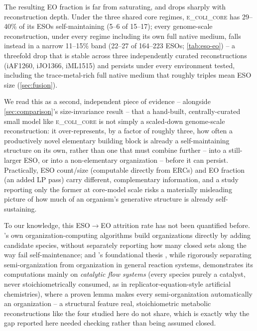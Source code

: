\documentclass[nocrop]{bioinfo}
\begin{document}
The resulting EO fraction is far from saturating, and drops sharply with reconstruction depth.
Under the three shared core regimes, \textsc{e\_coli\_core} has 29--40\% of its ESOs
self-maintaining (5--6 of 15--17); every genome-scale reconstruction, under every regime
including its own full native medium, falls instead in a narrow 11--15\% band (22--27 of
164--223 ESOs; \cref{tab:eso-eo}) -- a threefold drop that is stable across three independently
curated reconstructions (iAF1260, iJO1366, iML1515) and persists under every environment tested,
including the trace-metal-rich full native medium that roughly triples mean ESO size
(\cref{sec:fusion}).

We read this as a second, independent piece of evidence -- alongside \cref{sec:comparison}'s
size-invariance result -- that a hand-built, centrally-curated small model like
\textsc{e\_coli\_core} is not simply a scaled-down genome-scale reconstruction: it
over-represents, by a factor of roughly three, how often a productively novel elementary
building block is already a self-maintaining structure on its own, rather than one that must
combine further -- into a still-larger ESO, or into a non-elementary organization -- before it
can persist. Practically, ESO count/size (computable directly from ERCs) and EO fraction (an
added LP pass) carry different, complementary information, and a study reporting only the
former at core-model scale risks a materially misleading picture of how much of an organism's
generative structure is already self-sustaining.

To our knowledge, this ESO$\to$EO attrition rate has not been quantified before. \citeauthor{centler2008computing}'s
own organization-computing algorithms \citep{centler2008computing} build organizations directly
by adding candidate species, without separately reporting how many closed sets along the way
fail self-maintenance; and \citeauthor{seminal}'s foundational thesis \citep{speroni2007thesis},
while rigorously separating semi-organization from organization in general reaction systems,
demonstrates its computations mainly on \emph{catalytic flow systems} (every species purely a
catalyst, never stoichiometrically consumed, as in replicator-equation-style artificial
chemistries), where a proven lemma makes every semi-organization automatically an organization --
a structural feature real, stoichiometric metabolic reconstructions like the four studied here do
not share, which is exactly why the gap reported here needed checking rather than being assumed
closed.
\end{document}
